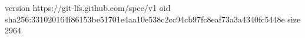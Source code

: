version https://git-lfs.github.com/spec/v1
oid sha256:331020164f86153be51701e4aa10e538c2cc94cb97fc8eaf73a3a4340fc5448e
size 2964
